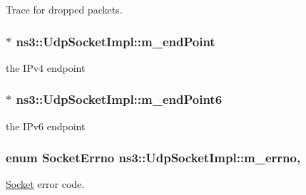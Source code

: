 Trace for dropped packets. 

\subsubsection[{\texorpdfstring{m\+\_\+end\+Point}{m_endPoint}}]{$\ast$ ns3\+::\+Udp\+Socket\+Impl\+::m\+\_\+end\+Point\hspace{0.3cm}{\ttfamily [private]}}\hypertarget{classns3_1_1UdpSocketImpl_a4ea3006a4e49185d06360beba92f4073}{}\label{classns3_1_1UdpSocketImpl_a4ea3006a4e49185d06360beba92f4073}


the I\+Pv4 endpoint 

\subsubsection[{\texorpdfstring{m\+\_\+end\+Point6}{m_endPoint6}}]{$\ast$ ns3\+::\+Udp\+Socket\+Impl\+::m\+\_\+end\+Point6\hspace{0.3cm}{\ttfamily [private]}}\hypertarget{classns3_1_1UdpSocketImpl_ad8b59997645c24d4550092d138270652}{}\label{classns3_1_1UdpSocketImpl_ad8b59997645c24d4550092d138270652}


the I\+Pv6 endpoint 

\subsubsection[{\texorpdfstring{m\+\_\+errno}{m_errno}}]{\setlength{\rightskip}{0pt plus 5cm}enum {\bf Socket\+Errno} ns3\+::\+Udp\+Socket\+Impl\+::m\+\_\+errno\hspace{0.3cm}{\ttfamily [mutable]}, {\ttfamily [private]}}\hypertarget{classns3_1_1UdpSocketImpl_ac35998e8aa2cc588e21752944b0a0095}{}\label{classns3_1_1UdpSocketImpl_ac35998e8aa2cc588e21752944b0a0095}


\hyperlink{classns3_1_1Socket}{Socket} error code. 

